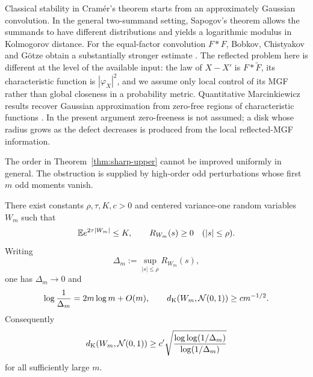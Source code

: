 Classical stability in Cram\'er's theorem starts from an approximately Gaussian convolution. In the general two-summand setting, Sapogov's theorem allows the summands to have different distributions and yields a logarithmic modulus in Kolmogorov distance. For the equal-factor convolution $F*F$, Bobkov, Chistyakov and G\"otze obtain a substantially stronger estimate \cite{Sapogov1951,BobkovChistyakovGotze2013}. The reflected problem here is different at the level of the available input: the law of $X-X'$ is $F*\widetilde F$, its characteristic function is $|\varphi_X|^2$, and we assume only local control of its MGF rather than global closeness in a probability metric. Quantitative Marcinkiewicz results recover Gaussian approximation from zero-free regions of characteristic functions \cite{EremenkoFryntov2021,DinhGhoshTranTran2025}. In the present argument zero-freeness is not assumed; a disk whose radius grows as the defect decreases is produced from the local reflected-MGF information.

The order in Theorem~\ref{thm:sharp-upper} cannot be improved uniformly in general. The obstruction is supplied by high-order odd perturbations whose first $m$ odd moments vanish.
\begin{theorem}\label{thm:sharpness}
There exist constants $\rho,\tau,K,c>0$ and centered variance-one random variables $W_m$ such that
\[
\mathbb E e^{2\tau|W_m|}\le K,
\qquad
R_{W_m}(s)\ge0\quad (|s|\le\rho).
\]
Writing
\[
\Delta_m:=\sup_{|s|\le\rho}R_{W_m}(s),
\]
one has $\Delta_m\to0$ and
\[
\log\frac1{\Delta_m}=2m\log m+O(m),
\qquad
d_{\mathrm K}(W_m,\mathcal N(0,1))\ge c m^{-1/2}.
\]
Consequently
\[
d_{\mathrm K}(W_m,\mathcal N(0,1))
\ge c'\sqrt{\frac{\log\log(1/\Delta_m)}{\log(1/\Delta_m)}}
\]
for all sufficiently large $m$.
\end{theorem}
